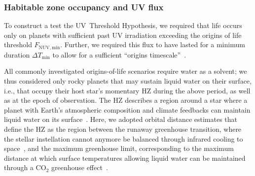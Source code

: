 \documentclass[twocolumn,twocolappendix,linenumbers]{aastex631}
\begin{document}
\subsubsection{Habitable zone occupancy and UV flux}\label{sec:met-hz}
To construct a test  the UV~Threshold Hypothesis, we required that life occurs only on  planets with sufficient past \gls{UV} irradiation exceeding the origins of life threshold $F_\mathrm{NUV, min}$.
Further, we required this flux to have lasted for a minimum duration $\Delta T_\mathrm{min}$ to allow for a sufficient ``origins timescale''~\citep{Rimmer2023}.
 

All commonly investigated origins-of-life scenarios require water as a solvent;
we thus considered only rocky planets that may sustain liquid water on their surface, i.e., that occupy their host star's momentary \gls{HZ} during the above period, as well as at the epoch of observation.
The \gls{HZ} describes a region around a star where a planet with Earth's atmospheric composition and climate feedbacks can maintain liquid water on its surface~\citep[e.g.,][]{Ramirez2017,Ramirez2018,MolLous2022,Spinelli2023,Tuchow2023}.
Here, we adopted orbital distance estimates that define the \gls{HZ} as the region between the runaway greenhouse transition, where the stellar instellation cannot anymore be balanced through infrared cooling to space~\citep{Ingersoll1969}, and the maximum greenhouse limit, corresponding to the maximum distance at which surface temperatures allowing liquid water can be maintained through a CO$_2$ greenhouse effect~\citep{Kasting1991,Kasting1993,Underwood2003,Kopparapu2013,Kopparapu2014}.
\end{document}
